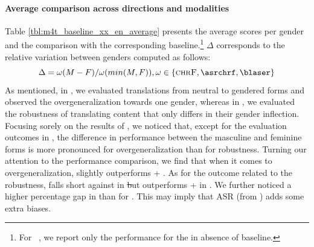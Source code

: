 \paragraph{Average comparison across directions and modalities} Table \ref{tbl:m4t_baseline_xx_en_average} presents the average scores per gender and the comparison with the corresponding baseline.\footnote{For \engx\ \sst, we report only the performance for the \mfourtlg in absence of baseline.} $\Delta$ corresponds to the relative variation between genders computed as follows:
\begin{equation*}
\Delta = \omega(M-F)/\omega(min(M,F)), \omega \in \{ \textsc{chrF}, \asrchrf, \blaser \}
\end{equation*}
As mentioned, in \engx, we evaluated translations from neutral to gendered forms and observed the overgeneralization towards one gender, whereas in \xeng, we evaluated the robustness of translating content that only differs in their gender inflection. Focusing sorely on the results of \mfourtlg, we noticed that, except for the evaluation outcomes in \blaser, the difference in performance between the masculine and feminine forms is more pronounced for overgeneralization than for robustness. Turning our attention to the performance comparison, we find that when it comes to overgeneralization, \mfourtlg slightly outperforms \whisperlarge + \nllbmedium. As for the outcome related to the robustness, \mfourtlg falls short against \whisperlarge in \st but outperforms \whisperlarge + \yourtts in \sst. We further noticed a higher percentage gap in \asrchrf than for \blaser. This may imply that ASR (from \asrchrf) adds some extra biases.




